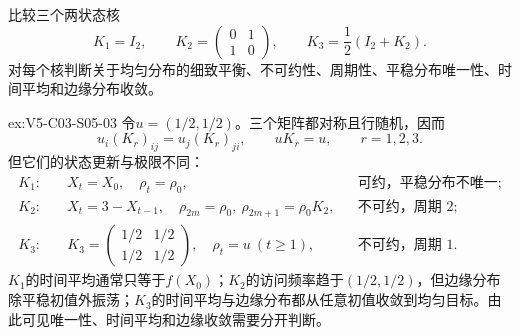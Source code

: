 \begin{SLChapterExercisePairSection}
\begin{exercise}\label{ex:V5-C03-S05-03}
比较三个两状态核
\[
K_1=I_2,\qquad
K_2=\begin{pmatrix}0&1\\1&0\end{pmatrix},
\qquad
K_3=\frac12(I_2+K_2).
\]
对每个核判断关于均匀分布的细致平衡、不可约性、周期性、平稳分布唯一性、时间平均和边缘分布收敛。
\end{exercise}
\ifSLFullEdition
{}\label{sol:V5-C03-S05-03}
\begin{chapterexercisesolution}{ex:V5-C03-S05-03}
令$u=(1/2,1/2)$。三个矩阵都对称且行随机，因而
\[
u_i(K_r)_{ij}=u_j(K_r)_{ji},\qquad uK_r=u,\qquad r=1,2,3.
\]
但它们的状态更新与极限不同：
\[
\begin{aligned}
K_1:&\quad X_t=X_0,\quad \rho_t=\rho_0,
&&\text{可约，平稳分布不唯一};\\
K_2:&\quad X_t=3-X_{t-1},\quad
\rho_{2m}=\rho_0,\ \rho_{2m+1}=\rho_0K_2,
&&\text{不可约，周期 }2;\\
K_3:&\quad K_3=\begin{pmatrix}1/2&1/2\\1/2&1/2\end{pmatrix},\quad
\rho_t=u\ (t\ge1),
&&\text{不可约，周期 }1.
\end{aligned}
\]
$K_1$的时间平均通常只等于$f(X_0)$；$K_2$的访问频率趋于$(1/2,1/2)$，但边缘分布除平稳初值外振荡；$K_3$的时间平均与边缘分布都从任意初值收敛到均匀目标。由此可见唯一性、时间平均和边缘收敛需要分开判断。
\end{chapterexercisesolution}
\fi


\end{SLChapterExercisePairSection}

